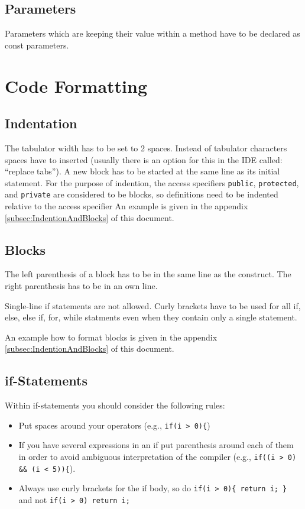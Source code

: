 \documentclass[final,a4paper,10pt, oneside]{article}
\begin{document}
\subsection{Parameters}
Parameters which are keeping their value within a method have to be declared as const parameters.

\section{Code Formatting}
\subsection{Indentation}
The tabulator width has to be set to 2 spaces.
Instead of tabulator characters spaces have to inserted (usually there is an option for this in the IDE called: ``replace tabs'').
A new block has to be started at the same line as its initial statement.
For the purpose of indention, the access specifiers \verb|public|, \verb|protected|, and \verb|private| are considered to be blocks, so definitions need to be indented relative to the access specifier
An example is given in the appendix \ref{subsec:IndentionAndBlocks} of this document.

\subsection{Blocks}
The left parenthesis of a block has to be in the same line as the construct. 
The right parenthesis has to be in an own line. 

Single-line if statements are not allowed. 
Curly brackets have to be used for all if, else, else if, for, while statments even when they contain only a single statement.

An example how to format blocks is given in the appendix \ref{subsec:IndentionAndBlocks} of this document.

\subsection{if-Statements}
Within if-statements you should consider the following rules:
\begin{itemize}
\item Put spaces around your operators (e.g., \verb|if(i > 0){|)
\item If you have several expressions in an if put parenthesis around each of them in order to avoid 
      ambiguous interpretation of the compiler (e.g., \verb|if((i > 0) && (i < 5)){|).
\item Always use curly brackets for the if body, so do \verb|if(i > 0){ return i; }| and not \verb|if(i > 0) return i;|

\end{itemize}
\end{document}
